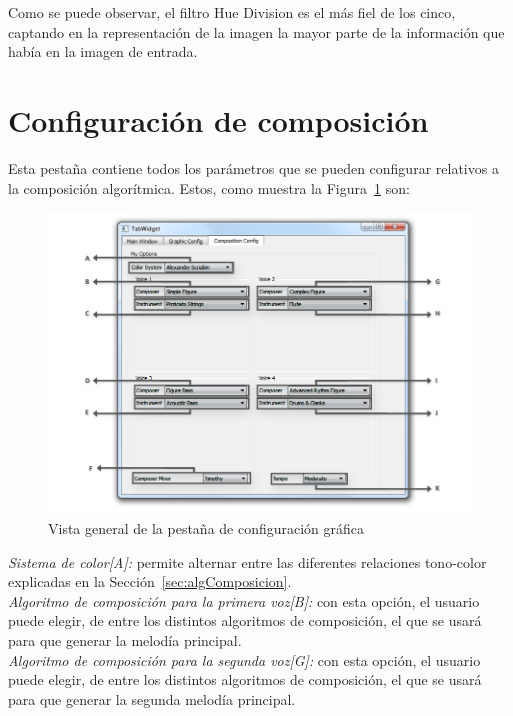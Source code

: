 		
		Como se puede observar, el filtro Hue Division es el más fiel de los cinco, captando en la representación de la imagen la mayor parte de la información que había en la imagen de entrada.

		
		\section{Configuración de composición}
		
		Esta pestaña contiene todos los parámetros que se pueden configurar relativos a la composición algorítmica. Estos, como muestra la Figura~\ref{fig:interfazcomp} son:\\
		
		\begin{figure}[htbp]
		\centering
		\hspace*{-0.6in}
		\includegraphics[scale=0.5]{graphics/interfazcomp.png}
		\caption{Vista general de la pestaña de configuración gráfica}
		\label{fig:interfazcomp}
		\end{figure}
		
		\noindent\textit{Sistema de color[A]:} permite alternar entre las diferentes relaciones tono-color explicadas en la Sección~\ref{sec:algComposicion}.\\
		
		\noindent\textit{Algoritmo de composición para la primera voz[B]:} con esta opción, el usuario puede elegir, de entre los distintos algoritmos de composición, el que se usará para que generar la melodía principal.\\
		
		\noindent\textit{Algoritmo de composición para la segunda voz[G]:} con esta opción, el usuario puede elegir, de entre los distintos algoritmos de composición, el que se usará para que generar la segunda melodía principal.\\

